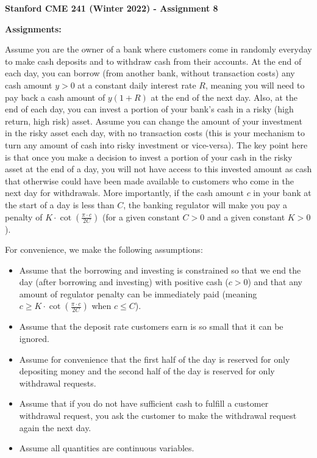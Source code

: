 \documentclass[12pt]{exam}
\begin{document}
\begin{center}
{\large {\bf Stanford CME 241 (Winter 2022) - Assignment 8}}
\end{center}
 
{\large{\bf Assignments:}}
\begin{questions}
\question Assume you are the owner of a bank where customers come in randomly everyday to make cash deposits and to withdraw cash from their accounts. At the end of each day, you can borrow (from another bank, without transaction costs) any cash amount $y > 0$ at a constant daily interest rate $R$, meaning you will need to pay back a cash amount of $y(1+R)$ at the end of the next day. Also, at the end of each day, you can invest a portion of your bank's cash in a risky (high return, high risk) asset. Assume you can change the amount of your investment in the risky asset each day, with no transaction costs (this is your mechanism to turn any amount of cash into risky investment or vice-versa). The key point here is that once you make a decision to invest a portion of your cash in the risky asset at the end of a day, you will not have access to this invested amount as cash that otherwise could have been made available to customers who come in the next day for withdrawals. More importantly, if the cash amount $c$ in your bank at the start of a day is less than $C$, the banking regulator will make you pay a penalty of $K \cdot \cot(\frac {\pi \cdot c}{2C})$ (for a given constant $C > 0$ and a given constant $K > 0$).

For convenience, we make the following assumptions:
\begin{itemize}
\item  Assume that the borrowing and investing is constrained so that we end the day (after borrowing and investing) with positive cash ($c >  0$) and that any amount of regulator penalty can be immediately paid (meaning $c \geq K \cdot \cot(\frac {\pi \cdot c}{2C})$ when $c \leq C$).
\item Assume that the deposit rate customers earn is so small that it can be ignored.
\item Assume for convenience that the first half of the day is reserved for only depositing money and the second half of the day is reserved for only withdrawal requests.
\item Assume that if you do not have sufficient cash to fulfill a customer withdrawal request, you ask the customer to make the withdrawal request again the next day.
\item Assume all quantities are continuous variables.
\end{itemize}


\end{questions}
\end{document}
